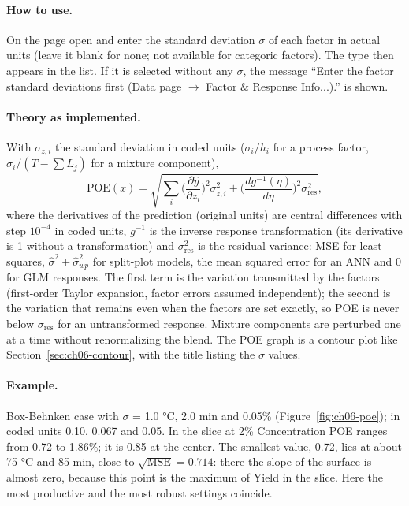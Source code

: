 \paragraph{How to use.} On the  page open  and enter the standard
deviation $\sigma$ of each factor in actual units (leave it blank for none; not available for categoric
factors). The type  then appears in the  list. If it is selected
without any $\sigma$, the message ``Enter the factor standard deviations first (Data page $\rightarrow$
Factor \& Response Info...).'' is shown.
\paragraph{Theory as implemented.} With $\sigma_{z,i}$ the standard deviation in coded units
($\sigma_i/h_i$ for a process factor, $\sigma_i/(T-\sum L_j)$ for a mixture component),
\begin{equation}
  \text{POE}(x)=\sqrt{\sum_i\Big(\frac{\partial\hat y}{\partial z_i}\Big)^2\sigma_{z,i}^2
  +\Big(\frac{dg^{-1}(\eta)}{d\eta}\Big)^2\sigma^2_{\text{res}}},
  \label{eq:ch06-poe}
\end{equation}
where the derivatives of the prediction (original units) are central differences with step $10^{-4}$ in
coded units, $g^{-1}$ is the inverse response transformation (its derivative is 1 without a
transformation) and $\sigma^2_{\text{res}}$ is the residual variance: MSE for least squares,
$\hat\sigma^2+\hat\sigma^2_{wp}$ for split-plot models, the mean squared error for an ANN and 0 for GLM
responses. The first term is the variation transmitted by the factors (first-order Taylor expansion, factor
errors assumed independent); the second is the variation that remains even when the factors are set exactly,
so POE is never below $\sigma_{\text{res}}$ for an untransformed response. Mixture components are perturbed
one at a time without renormalizing the blend. The POE graph is a contour plot like
Section~\ref{sec:ch06-contour}, with the title listing the $\sigma$ values.
\paragraph{Example.} Box-Behnken case with $\sigma$ = 1.0 °C, 2.0 min and 0.05\% (Figure~\ref{fig:ch06-poe});
in coded units 0.10, 0.067 and 0.05. In the slice at 2\% Concentration POE ranges from 0.72 to 1.86\%; it is
0.85 at the center. The smallest value, 0.72, lies at about 75 °C and 85 min, close to
$\sqrt{\text{MSE}}=0.714$: there the slope of the surface is almost zero, because this point is the
maximum of Yield in the slice. Here the most productive and the most robust settings coincide.

